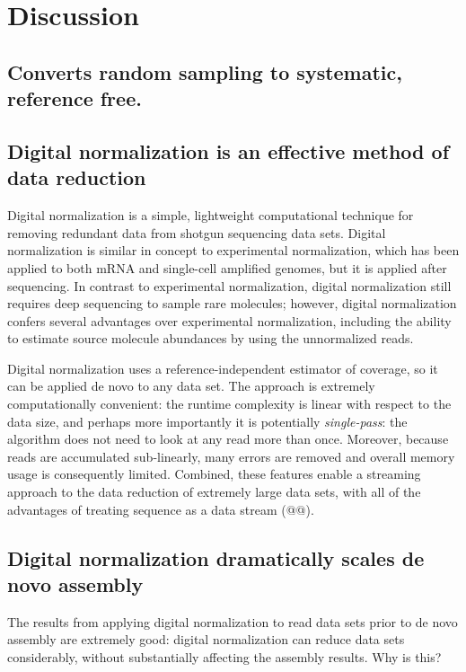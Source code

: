 \documentclass[10pt,draft]{article}
\begin{document}

\section*{Discussion}

\subsection*{Converts random sampling to systematic, reference free.}

\subsection*{Digital normalization is an effective method of data reduction}

Digital normalization is a simple, lightweight computational technique
for removing redundant data from shotgun sequencing data sets.
Digital normalization is similar in concept to experimental
normalization, which has been applied to both mRNA and single-cell
amplified genomes, but it is applied after sequencing.  In contrast to
experimental normalization, digital normalization still requires deep
sequencing to sample rare molecules; however, digital normalization
confers several advantages over experimental normalization, including
the ability to estimate source molecule abundances by using the
unnormalized reads.

Digital normalization uses a reference-independent estimator of
coverage, so it can be applied de novo to any data set.  The approach
is extremely computationally convenient: the runtime complexity is
linear with respect to the data size, and perhaps more importantly it
is potentially {\em single-pass}: the algorithm does not need to look
at any read more than once.  Moreover, because reads are accumulated
sub-linearly, many errors are removed and overall memory usage is
consequently limited.  Combined, these features enable a streaming
approach to the data reduction of extremely large data sets, with all
of the advantages of treating sequence as a data stream (@@).

\subsection*{Digital normalization dramatically scales de novo assembly}

The results from applying digital normalization to read data sets
prior to de novo assembly are extremely good: digital normalization
can reduce data sets considerably, without substantially affecting the
assembly results.  Why is this?
\end{document}
